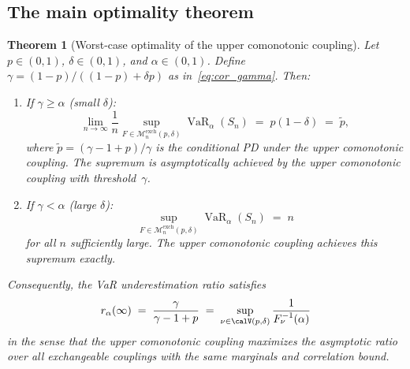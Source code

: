 \documentclass[11pt]{article}
\newtheorem{theorem}{Theorem}[section]
\theoremstyle{definition}
\newcommand{\VaR}{\operatorname{VaR}}
\newcommand{\1}{\mathbf{1}}
\newcommand{\calM}{\mathcal{M}}
\begin{document}
\subsection{The main optimality theorem}

\begin{theorem}[Worst-case optimality of the upper comonotonic coupling]\label{thm:wc_optimality}
Let $p \in (0,1)$, $\delta \in (0,1)$, and $\alpha \in (0,1)$. Define $\gamma = (1-p)/((1-p) + \delta p)$ as in~\eqref{eq:cor_gamma}. Then:

\begin{enumerate}[label=(\alph*)]
  \item If $\gamma \geq \alpha$ (small $\delta$):
  \begin{equation}\label{eq:wc_small_delta}
    \lim_{n \to \infty} \frac{1}{n}\sup_{F \in \calM_n^{\mathrm{exch}}(p,\delta)} \VaR_\alpha(S_n) \;=\; p(1-\delta) \;=\; \tilde{p},
  \end{equation}
  where $\tilde{p} = (\gamma - 1 + p)/\gamma$ is the conditional PD under the upper comonotonic coupling. The supremum is asymptotically achieved by the upper comonotonic coupling with threshold~$\gamma$.

  \item If $\gamma < \alpha$ (large $\delta$):
  \begin{equation}\label{eq:wc_large_delta}
    \sup_{F \in \calM_n^{\mathrm{exch}}(p,\delta)} \VaR_\alpha(S_n) \;=\; n
  \end{equation}
  for all $n$ sufficiently large. The upper comonotonic coupling achieves this supremum exactly.
\end{enumerate}

Consequently, the VaR underestimation ratio satisfies
\begin{equation}\label{eq:ratio_wc}
  r_\alpha(\infty) \;=\; \frac{\gamma}{\gamma - 1 + p} \;=\; \sup_{\nu \in \calV(p,\delta)} \frac{1}{F_\nu^{-1}(\alpha)}
\end{equation}
in the sense that the upper comonotonic coupling maximizes the asymptotic ratio over all exchangeable couplings with the same marginals and correlation bound.
\end{theorem}
\end{document}
